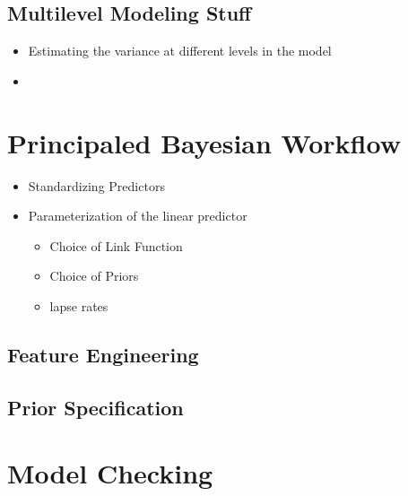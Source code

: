 \documentclass[
]{report}
\providecommand{\tightlist}{%
  \setlength{\itemsep}{0pt}\setlength{\parskip}{0pt}}
\begin{document}
\hypertarget{multilevel-modeling-stuff}{%
\section{Multilevel Modeling Stuff}\label{multilevel-modeling-stuff}}

\begin{itemize}
\item
  Estimating the variance at different levels in the model
\item
\end{itemize}

\hypertarget{workflow}{%
\chapter{Principaled Bayesian Workflow}\label{workflow}}

\begin{itemize}
\tightlist
\item
  Standardizing Predictors
\item
  Parameterization of the linear predictor

  \begin{itemize}
  \tightlist
  \item
    Choice of Link Function
  \item
    Choice of Priors
  \item
    lapse rates
  \end{itemize}
\end{itemize}

\hypertarget{feature-engineering}{%
\section{Feature Engineering}\label{feature-engineering}}

\hypertarget{prior-specification}{%
\section{Prior Specification}\label{prior-specification}}

\hypertarget{model-checking}{%
\chapter{Model Checking}\label{model-checking}}
\end{document}
